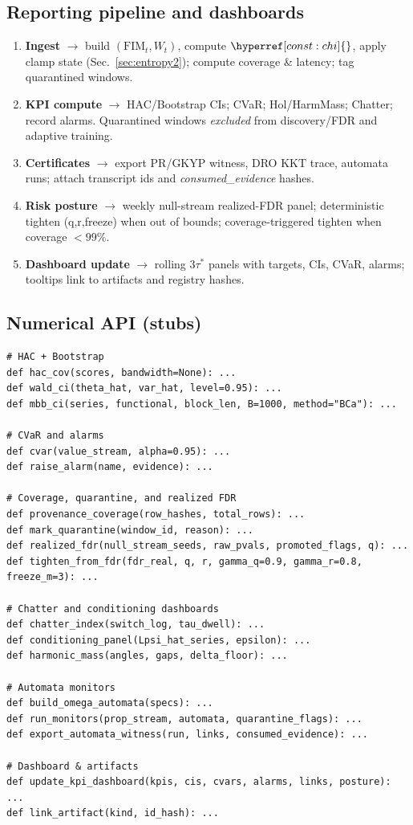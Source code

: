 \documentclass[10pt]{article}
\newcommand{\FIM}{\mathrm{FIM}}
\newcommand{\constref}[1]{\hyperref[const:#1]{\ensuremath{\csname constsym#1\endcsname}}}
\begin{document}
\subsection*{Reporting pipeline and dashboards}
\begin{enumerate}[leftmargin=*,itemsep=2pt]
\item \textbf{Ingest} $\to$ build $(\FIM_t,W_t)$, compute $\constref{chi}$, apply clamp state (Sec.~\ref{sec:entropy2}); compute coverage \& latency; tag quarantined windows.
\item \textbf{KPI compute} $\to$ HAC/Bootstrap CIs; CVaR; Hol/HarmMass; Chatter; record alarms. Quarantined windows \emph{excluded} from discovery/FDR and adaptive training.
\item \textbf{Certificates} $\to$ export PR/GKYP witness, DRO KKT trace, automata runs; attach transcript ids and \emph{consumed\_evidence} hashes.
\item \textbf{Risk posture} $\to$ weekly null-stream realized-FDR panel; deterministic tighten (q,r,freeze) when out of bounds; coverage-triggered tighten when coverage $<99\%$.
\item \textbf{Dashboard update} $\to$ rolling $3\tau^\ast$ panels with targets, CIs, CVaR, alarms; tooltips link to artifacts and registry hashes.
\end{enumerate}

\subsection*{Numerical API (stubs)}
\begin{lstlisting}
# HAC + Bootstrap
def hac_cov(scores, bandwidth=None): ...
def wald_ci(theta_hat, var_hat, level=0.95): ...
def mbb_ci(series, functional, block_len, B=1000, method="BCa"): ...

# CVaR and alarms
def cvar(value_stream, alpha=0.95): ...
def raise_alarm(name, evidence): ...

# Coverage, quarantine, and realized FDR
def provenance_coverage(row_hashes, total_rows): ...
def mark_quarantine(window_id, reason): ...
def realized_fdr(null_stream_seeds, raw_pvals, promoted_flags, q): ...
def tighten_from_fdr(fdr_real, q, r, gamma_q=0.9, gamma_r=0.8, freeze_m=3): ...

# Chatter and conditioning dashboards
def chatter_index(switch_log, tau_dwell): ...
def conditioning_panel(Lpsi_hat_series, epsilon): ...
def harmonic_mass(angles, gaps, delta_floor): ...

# Automata monitors
def build_omega_automata(specs): ...
def run_monitors(prop_stream, automata, quarantine_flags): ...
def export_automata_witness(run, links, consumed_evidence): ...

# Dashboard & artifacts
def update_kpi_dashboard(kpis, cis, cvars, alarms, links, posture): ...
def link_artifact(kind, id_hash): ...
\end{lstlisting}
\end{document}
